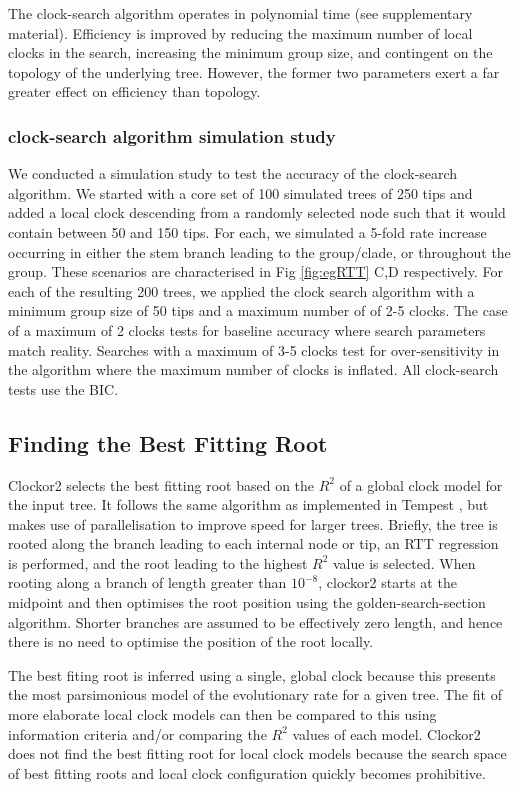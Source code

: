 \documentclass{article}
\begin{document}
The clock-search algorithm operates in polynomial time (see supplementary material). Efficiency is improved by reducing the maximum number of local clocks in the search, increasing the minimum group size, and contingent on the topology of the underlying tree. However, the former two parameters exert a far greater effect on efficiency than topology.

\subsubsection*{clock-search algorithm simulation study}
We conducted a simulation study to test the accuracy of the clock-search algorithm. We started with a core set of 100 simulated trees of 250 tips and added a local clock descending from a randomly selected node such that it would contain between 50 and 150 tips. For each, we simulated a 5-fold rate increase occurring in either the stem branch leading to the group/clade, or throughout the group. These scenarios are characterised in  Fig \ref{fig:egRTT} C,D respectively. For each of the resulting 200 trees, we applied the clock search algorithm with a minimum group size of 50 tips and a maximum number of of 2-5 clocks. The case of a maximum of 2 clocks tests for baseline accuracy where search parameters match reality. Searches with a maximum of 3-5 clocks test for over-sensitivity in the algorithm where the maximum number of clocks is inflated. All clock-search tests use the BIC.


\subsection*{Finding the Best Fitting Root}
Clockor2 selects the best fitting root based on the $R^2$ of a global clock model for the input tree. It follows the same algorithm as implemented in Tempest \citet{rambaut_exploring_2016}, but makes use of parallelisation to improve speed for larger trees. Briefly, the tree is rooted along the branch leading to each internal node or tip, an RTT regression is performed, and the root leading to the highest $R^2$ value is selected. When rooting along a branch of length greater than $10^{-8}$, clockor2 starts at the midpoint and then optimises the root position using the golden-search-section algorithm. Shorter branches are assumed to be effectively zero length, and hence there is no need to optimise the position of the root locally.

The best fiting root is inferred using a single, global clock because this presents the most parsimonious model of the evolutionary rate for a given tree. The fit of more elaborate local clock models can then be compared to this using information criteria and/or comparing the $R^2$ values of each model. Clockor2 does not find the best fitting root for local clock models because the search space of best fitting roots and local clock configuration quickly becomes prohibitive.
\end{document}
